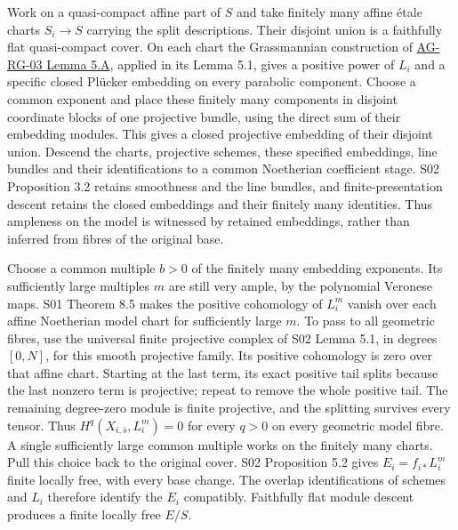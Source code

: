 \documentclass[11pt,a4paper,openany]{report}
\begin{document}
Work on a quasi-compact affine part of \(S\) and take finitely many affine étale charts \(S_i\to S\) carrying the split descriptions. Their disjoint union is a faithfully flat quasi-compact cover. On each chart the Grassmannian construction of \href{https://github.com/KokunoYumeto/open-math-courses/blob/main/docs/courses/AG-RG/AG-RG-03.md\#ag-rg-03-grassmannian}{AG-RG-03 Lemma 5.A}, applied in its Lemma 5.1, gives a positive power of \(L_i\) and a specific closed Plücker embedding on every parabolic component. Choose a common exponent and place these finitely many components in disjoint coordinate blocks of one projective bundle, using the direct sum of their embedding modules. This gives a closed projective embedding of their disjoint union. Descend the charts, projective schemes, these specified embeddings, line bundles and their identifications to a common Noetherian coefficient stage. S02 Proposition 3.2 retains smoothness and the line bundles, and finite-presentation descent retains the closed embeddings and their finitely many identities. Thus ampleness on the model is witnessed by retained embeddings, rather than inferred from fibres of the original base.

Choose a common multiple \(b>0\) of the finitely many embedding exponents. Its sufficiently large multiples \(m\) are still very ample, by the polynomial Veronese maps. S01 Theorem 8.5 makes the positive cohomology of \(L_i^m\) vanish over each affine Noetherian model chart for sufficiently large \(m\). To pass to all geometric fibres, use the universal finite projective complex of S02 Lemma 5.1, in degrees \([0,N]\), for this smooth projective family. Its positive cohomology is zero over that affine chart. Starting at the last term, its exact positive tail splits because the last nonzero term is projective; repeat to remove the whole positive tail. The remaining degree-zero module is finite projective, and the splitting survives every tensor. Thus \(H^q(X_{i,\bar s},L_i^m)=0\) for every \(q>0\) on every geometric model fibre. A single sufficiently large common multiple works on the finitely many charts. Pull this choice back to the original cover. S02 Proposition 5.2 gives \(E_i=f_{i*}L_i^m\) finite locally free, with every base change. The overlap identifications of schemes and \(L_i\) therefore identify the \(E_i\) compatibly. Faithfully flat module descent produces a finite locally free \(E/S\).
\end{document}
